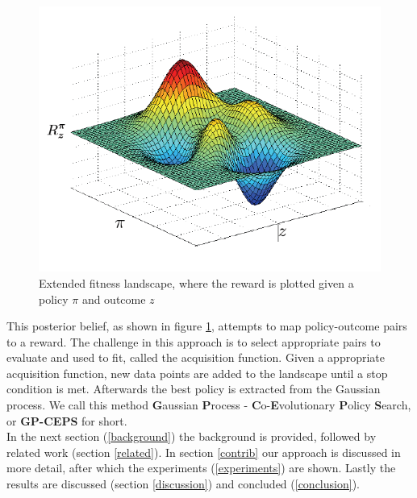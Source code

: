 \begin{figure}[ht]
  \centering
  \includegraphics[scale=0.5]{images/fitness-landscape.png}
  \caption{Extended fitness landscape, where the reward is plotted given a policy $\pi$ and outcome $z$}\label{fitnesslandscape}
\end{figure}


This posterior belief, as shown in figure \ref{fitnesslandscape}, attempts to map policy-outcome pairs to a reward. The challenge in this approach is to select appropriate pairs to evaluate and used to fit, called the acquisition function. Given a appropriate acquisition function, new data points are added to the landscape until a stop condition is met. Afterwards the best policy is extracted from the Gaussian process. We call this method \textbf{G}aussian \textbf{P}rocess - \textbf{C}o-\textbf{E}volutionary \textbf{P}olicy \textbf{S}earch, or \textbf{GP-CEPS} for short. \\


In the next section (\ref{background}) the background is provided, followed by related work (section \ref{related}). In section \ref{contrib} our approach is discussed in more detail, after which the experiments (\ref{experiments}) are shown. Lastly the results are discussed (section \ref{discussion}) and concluded (\ref{conclusion}).
